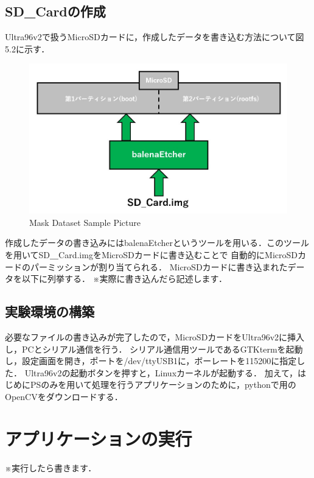 \documentclass[11pt,a4j]{jreport}
\begin{document}
\subsection{SD_Cardの作成}
Ultra96v2で扱うMicroSDカードに，作成したデータを書き込む方法について図5.2に示す．
\begin{figure}[H]
  \center
  \includegraphics[scale = 0.7]{pict/pict6.jpg}
  \caption{Mask Dataset Sample Picture}
\end{figure}
作成したデータの書き込みにはbalenaEtcherというツールを用いる．このツールを用いてSD＿Card.imgをMicroSDカードに書き込むことで
自動的にMicroSDカードのパーミッションが割り当てられる．
MicroSDカードに書き込まれたデータを以下に列挙する．
※実際に書き込んだら記述します．

\subsection{実験環境の構築}
必要なファイルの書き込みが完了したので，MicroSDカードをUltra96v2に挿入し，PCとシリアル通信を行う．
シリアル通信用ツールであるGTKtermを起動し，設定画面を開き，ポートを/dev/ttyUSB1に，ボーレートを115200に指定した．
Ultra96v2の起動ボタンを押すと，Linuxカーネルが起動する．
加えて，はじめにPSのみを用いて処理を行うアプリケーションのために，pythonで用のOpenCVをダウンロードする．
\section{アプリケーションの実行}
※実行したら書きます．
\end{document}
